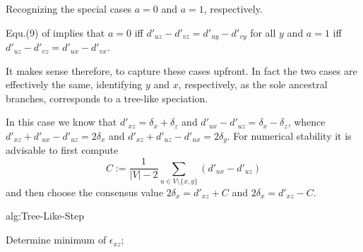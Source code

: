 \documentclass{article}
\begin{document}
Recognizing the special cases $a =0$ and $a =1$, respectively.

Equ.(9) of \cite{Prohaska:17a} implies that $a=0$ iff 
$d'_{uz}-d'_{vz} = d'_{uy}-d'_{vy}$ for all $y$ and $a=1$ iff 
$d'_{uz}-d'_{vz} = d'_{ux}-d'_{vx}$.

It makes sense therefore, to capture these cases upfront. In fact the two
cases are effectively the same, identifying $y$ and $x$, respectively, as
the sole ancestral branches, corresponds to a tree-like speciation. 

In this case we know that $d'_{xz}=\delta_x+\delta_z$ and 
$d'_{ux}-d'_{uz}=\delta_x-\delta_z$, whence 
$d'_{xz}+d'_{ux}-d'_{uz}=2\delta_x$
and 
$d'_{xz}+d'_{uz}-d'_{ux}=2\delta_y$. 
For numerical stability it is advisable to first compute 
\begin{equation} 
  C := \frac{1}{|V|-2} \sum_{u\in V\setminus\{x,y\}} (d'_{ux}-d'_{uz})
\end{equation} 
and then choose the consensus value $2\delta_x = d'_{xz}+C$ and 
$2\delta_x = d'_{xz}-C$.



\begin{algorithm}[H]
\caption{alg:Tree-Like-Step}
 \SetAlgoLined
 Determine minimum of $\epsilon_{xz}$;
\end{algorithm}


      
   
\end{document}
